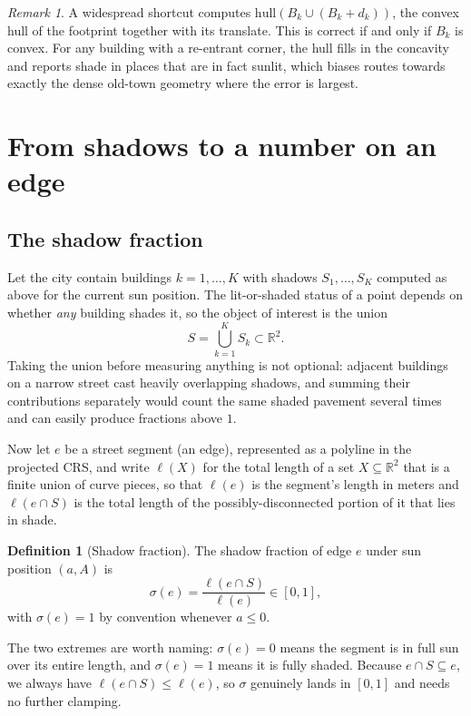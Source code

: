 \documentclass[11pt,a4paper]{article}
\theoremstyle{plain}
\theoremstyle{definition}
\newtheorem{definition}{Definition}
\theoremstyle{remark}
\newtheorem{remark}{Remark}
\begin{document}
\begin{remark}
A widespread shortcut computes $\mathrm{hull}(B_k \cup (B_k + d_k))$, the convex hull of the footprint together with its translate. This is correct if and only if $B_k$ is convex. For any building with a re-entrant corner, the hull fills in the concavity and reports shade in places that are in fact sunlit, which biases routes towards exactly the dense old-town geometry where the error is largest.
\end{remark}

\section{From shadows to a number on an edge}
\label{sec:fraction}

\subsection{The shadow fraction}

Let the city contain buildings $k = 1, \dots, K$ with shadows $S_1, \dots, S_K$ computed as above for the current sun position. The lit-or-shaded status of a point depends on whether \emph{any} building shades it, so the object of interest is the union
$$S = \bigcup_{k=1}^{K} S_k \subset \mathbb{R}^2.$$
Taking the union before measuring anything is not optional: adjacent buildings on a narrow street cast heavily overlapping shadows, and summing their contributions separately would count the same shaded pavement several times and can easily produce fractions above $1$.

Now let $e$ be a street segment (an edge), represented as a polyline in the projected CRS, and write $\ell(X)$ for the total length of a set $X \subseteq \mathbb{R}^2$ that is a finite union of curve pieces, so that $\ell(e)$ is the segment's length in meters and $\ell(e \cap S)$ is the total length of the possibly-disconnected portion of it that lies in shade.

\begin{definition}[Shadow fraction]
The shadow fraction of edge $e$ under sun position $(a, A)$ is
$$\sigma(e) = \frac{\ell(e \cap S)}{\ell(e)} \in [0, 1],$$
with $\sigma(e) = 1$ by convention whenever $a \le 0$.
\end{definition}

The two extremes are worth naming: $\sigma(e) = 0$ means the segment is in full sun over its entire length, and $\sigma(e) = 1$ means it is fully shaded. Because $e \cap S \subseteq e$, we always have $\ell(e \cap S) \le \ell(e)$, so $\sigma$ genuinely lands in $[0,1]$ and needs no further clamping.
\end{document}
